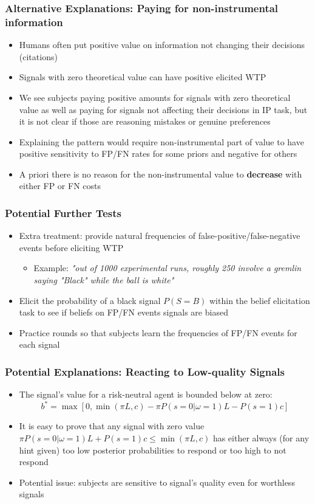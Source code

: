 \documentclass[11pt,hyperref={bookmarks=false}]{beamer}
\begin{document}
\begin{frame}
\frametitle{Alternative Explanations: Paying for non-instrumental information}
\begin{itemize}
\item Humans often put positive value on information not changing their decisions (citations)
\item Signals with zero theoretical value can have positive elicited WTP
\item We see subjects paying positive amounts for signals with zero theoretical value as well as paying for signals not affecting their decisions in IP task, but it is not clear if those are reasoning mistakes or genuine preferences
\item Explaining the pattern would require non-instrumental part of value to have positive sensitivity to FP/FN rates for some priors and negative for others
\item A priori there is no reason for the non-instrumental value to \textbf{decrease} with either FP or FN costs
\end{itemize}
\end{frame}



\begin{frame}
\frametitle{Potential Further Tests}
\begin{itemize}
\item Extra treatment: provide natural frequencies of false-positive/false-negative events before eliciting WTP
\begin{itemize}
\item Example: \textit{"out of 1000 experimental runs, roughly 250 involve a gremlin saying "Black" while the ball is white"}
\end{itemize}
\item Elicit the probability of a black signal $P(S=B)$ within the belief elicitation task to see if beliefs on FP/FN events signals are biased
\item Practice rounds so that subjects learn the frequencies of FP/FN events for each signal
\end{itemize}
\end{frame}





\iffalse


\begin{frame}
\frametitle{Potential Explanations: Reacting to Low-quality Signals}
\begin{itemize}
\item The signal's value for a risk-neutral agent is bounded below at zero: 
$$b^*=\max[0,\min(\pi L, c)-\pi P(s=0|\omega=1)L-P(s=1)c]$$
\item It is easy to prove that any signal with zero value $\pi P(s=0|\omega=1)L+P(s=1)c\leq \min(\pi L, c)$ has either always (for any hint given) too low posterior probabilities to respond or too high to not respond
\item Potential issue: subjects are sensitive to signal's quality even for worthless signals
\end{itemize}
\end{frame}
\end{document}
